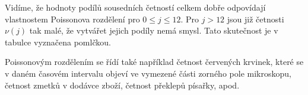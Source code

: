 \begin{mdframed}[style=mdexam]
\begin{example}
    {\centering {}
    \par}
 
    Vidíme, že hodnoty podílů sousedních četností celkem dobře odpovídají vlastnostem Poissonova
    rozdělení pro \(0 \leq j \leq 12\). Pro \(j > 12\) jsou již četnosti \(\nu(j)\) tak malé, že
    vytvářet jejich podíly nemá smysl. Tato skutečnost je v tabulce vyznačena pomlčkou.
    
    Poissonovým rozdělením se řídí také například četnost červených krvinek, které se v daném
    časovém intervalu objeví ve vymezené části zorného pole mikroskopu, četnost zmetků v dodávce
    zboží, četnost překlepů písařky, apod.
  \end{example}
\end{mdframed}